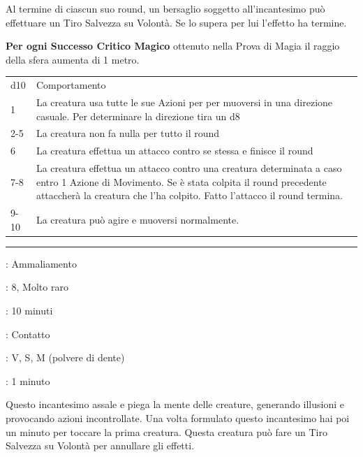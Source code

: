 \begin{multicols}{2}
Al termine di ciascun suo round, un bersaglio soggetto all'incantesimo può effettuare un Tiro Salvezza su Volontà. Se lo supera per lui l'effetto ha termine.

\textbf{Per ogni Successo Critico Magico} ottenuto nella Prova di Magia il raggio della sfera aumenta di 1 metro.


\medskip

\begin{tabularx}{0.45\textwidth}{lX}
	\hline
	d10 & Comportamento\\
	1 & La creatura usa tutte le sue Azioni per per muoversi in una direzione casuale. Per determinare la direzione tira un d8\\
	2-5 & La creatura non fa nulla per tutto il round\\
	6 & La creatura effettua un attacco contro se stessa e finisce il round\\
	7-8 & La creatura effettua un attacco contro una creatura determinata a caso entro 1 Azione di Movimento. Se è stata colpita il round precedente attaccherà la creatura che l'ha colpito. Fatto l'attacco il round termina.\\
	9-10 & La creatura può agire e muoversi normalmente.
\end{tabularx}


\smallskip\noindent\rule{\linewidth}{2pt} \hypertarget{Confusione Contagiosa}{}\medskip{}
\noindent
\begin{description}[noitemsep, topsep=0pt, parsep=0pt, partopsep=0pt, leftmargin=0cm, labelwidth=2.8cm]
	\item[\textbf{Lista di Magia}]: Ammaliamento
	\item[\textbf{Livello}]: 8, Molto raro
	\item[\textbf{T. di Lancio}]: 10 minuti
	\item[\textbf{Gittata}]: Contatto
	\item[\textbf{Componenti}]: V, S, M (polvere di dente)
	\item[\textbf{Durata}]: 1 minuto
\end{description}

Questo incantesimo assale e piega la mente delle creature, generando illusioni e provocando azioni incontrollate. Una volta formulato questo incantesimo hai poi un minuto per toccare la prima creatura. Questa creatura può fare un Tiro Salvezza su Volontà per annullare gli effetti.


\end{multicols}
